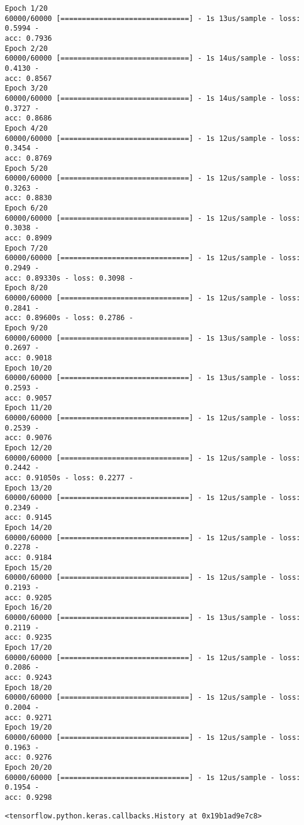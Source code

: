 \documentclass[11pt]{article}
\makeatletter
\newcommand{\boxspacing}{\kern\kvtcb@left@rule\kern\kvtcb@boxsep}
\newcommand{\prompt}[4]{
        \ttfamily\llap{{\color{#2}[#3]:\hspace{3pt}#4}}\vspace{-\baselineskip}
    }
\makeatother
\begin{document}
    \begin{Verbatim}[commandchars=\\\{\}]
Epoch 1/20
60000/60000 [==============================] - 1s 13us/sample - loss: 0.5994 -
acc: 0.7936
Epoch 2/20
60000/60000 [==============================] - 1s 14us/sample - loss: 0.4130 -
acc: 0.8567
Epoch 3/20
60000/60000 [==============================] - 1s 14us/sample - loss: 0.3727 -
acc: 0.8686
Epoch 4/20
60000/60000 [==============================] - 1s 12us/sample - loss: 0.3454 -
acc: 0.8769
Epoch 5/20
60000/60000 [==============================] - 1s 12us/sample - loss: 0.3263 -
acc: 0.8830
Epoch 6/20
60000/60000 [==============================] - 1s 12us/sample - loss: 0.3038 -
acc: 0.8909
Epoch 7/20
60000/60000 [==============================] - 1s 12us/sample - loss: 0.2949 -
acc: 0.89330s - loss: 0.3098 -
Epoch 8/20
60000/60000 [==============================] - 1s 12us/sample - loss: 0.2841 -
acc: 0.89600s - loss: 0.2786 -
Epoch 9/20
60000/60000 [==============================] - 1s 13us/sample - loss: 0.2697 -
acc: 0.9018
Epoch 10/20
60000/60000 [==============================] - 1s 13us/sample - loss: 0.2593 -
acc: 0.9057
Epoch 11/20
60000/60000 [==============================] - 1s 12us/sample - loss: 0.2539 -
acc: 0.9076
Epoch 12/20
60000/60000 [==============================] - 1s 12us/sample - loss: 0.2442 -
acc: 0.91050s - loss: 0.2277 -
Epoch 13/20
60000/60000 [==============================] - 1s 12us/sample - loss: 0.2349 -
acc: 0.9145
Epoch 14/20
60000/60000 [==============================] - 1s 12us/sample - loss: 0.2278 -
acc: 0.9184
Epoch 15/20
60000/60000 [==============================] - 1s 12us/sample - loss: 0.2193 -
acc: 0.9205
Epoch 16/20
60000/60000 [==============================] - 1s 13us/sample - loss: 0.2119 -
acc: 0.9235
Epoch 17/20
60000/60000 [==============================] - 1s 12us/sample - loss: 0.2086 -
acc: 0.9243
Epoch 18/20
60000/60000 [==============================] - 1s 12us/sample - loss: 0.2004 -
acc: 0.9271
Epoch 19/20
60000/60000 [==============================] - 1s 12us/sample - loss: 0.1963 -
acc: 0.9276
Epoch 20/20
60000/60000 [==============================] - 1s 12us/sample - loss: 0.1954 -
acc: 0.9298
    \end{Verbatim}

            \begin{tcolorbox}[breakable, size=fbox, boxrule=.5pt, pad at break*=1mm, opacityfill=0]
\prompt{Out}{outcolor}{84}{\boxspacing}
\begin{Verbatim}[commandchars=\\\{\}]
<tensorflow.python.keras.callbacks.History at 0x19b1ad9e7c8>
\end{Verbatim}
\end{tcolorbox}
        
\end{document}
